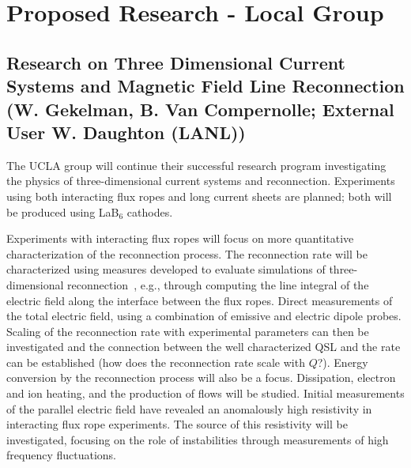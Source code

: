\documentclass[11pt]{article}
\renewcommand{\cite}{\citep}
\begin{document}
\section{Proposed Research - Local Group}


\subsection{Research on Three Dimensional Current Systems and Magnetic Field
Line Reconnection (W. Gekelman, B. Van Compernolle; External User
W. Daughton (LANL))}

The UCLA group will continue their successful
research program investigating the physics of three-dimensional
current systems and reconnection.  Experiments using both interacting
flux ropes and long current sheets are planned; both will be produced
using LaB$_6$ cathodes.  

Experiments with interacting flux ropes will focus on more
quantitative characterization of the reconnection process.  The
reconnection rate will be characterized using measures developed to
evaluate simulations of three-dimensional
reconnection~\cite{finn:2014,daughton:2014}, e.g., through computing
the line integral of the electric field along the interface between the
flux ropes. Direct measurements of the total electric field, using a
combination of emissive and electric dipole probes.  Scaling of the
reconnection rate with experimental parameters can then be investigated
and the connection between the well characterized QSL and the rate can
be established (how does the reconnection rate scale with $Q$?).
Energy conversion by the reconnection process will also be a focus.
Dissipation, electron and ion heating, and the production of flows
will be studied.  
Initial measurements of the parallel electric field
have revealed an anomalously high resistivity in interacting flux rope
experiments.  The source of this resistivity will be investigated,
focusing on the role of instabilities through measurements of high
frequency fluctuations.
\end{document}

